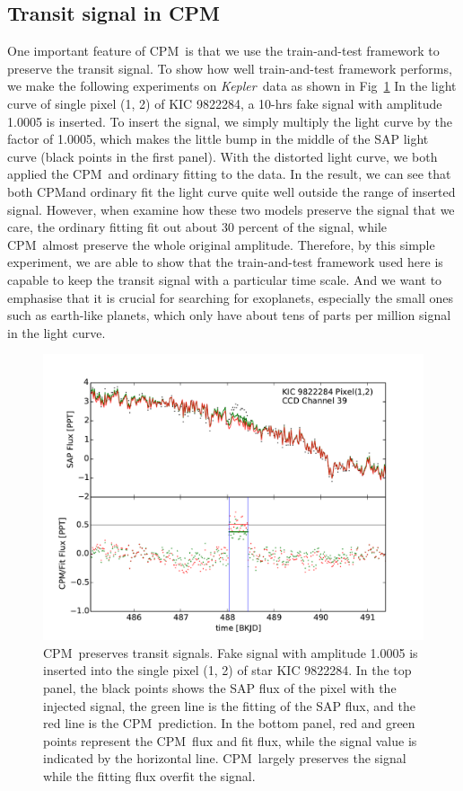 \documentclass[12pt, preprint]{aastex}
\newcommand{\project}[1]{\textsl{#1}}
\newcommand{\Kepler}{\project{Kepler}}
\newcommand{\name}{CPM}
\begin{document}
\subsection{Transit signal in \name}
One important feature of \name\ is that we use the train-and-test framework to preserve 
the transit signal. To show how well train-and-test framework performs, we make the
following experiments on \Kepler\ data as shown in Fig~\ref{distortion}
In the light curve of single pixel (1, 2) of KIC 9822284, a 10-hrs fake signal 
with amplitude 1.0005 is inserted. To insert the signal, we simply multiply the light curve 
by the factor of 1.0005, which makes the little bump in the middle of the SAP light curve 
(black points in the first panel). With the distorted light curve, we both applied the 
\name\ and ordinary fitting to the data. In the result, we can see that both \name and 
ordinary fit the light curve quite well outside the range of inserted signal. However, 
when examine how these two models preserve the signal that we care, the ordinary
fitting fit out about 30 percent of the signal, while \name\ almost preserve the whole 
original amplitude. Therefore,  by this simple experiment, we are able to show that 
the train-and-test framework used here is capable to keep the transit signal with 
a particular time scale. And we want to emphasise that it is crucial for searching for
exoplanets, especially the small ones such as earth-like planets, which only have  
about tens of parts per million signal in the light curve.

\begin{figure}[htb]
\centering
\includegraphics[width=\columnwidth]{distortion_9822284_normal}
\caption{
  \label{distortion} 
  \name\ preserves transit signals. 
  Fake signal with amplitude 1.0005 is inserted into the single pixel (1, 2) of star KIC 9822284. 
  In the top panel, the black points shows the SAP flux of the pixel with the injected signal, 
    the green line is the fitting of the SAP flux, and the red line is the \name\ prediction. 
  In the bottom panel, red and green points represent the \name\ flux and fit flux, 
    while the signal value is indicated by the horizontal line. 
  \name\ largely preserves the signal while the fitting flux overfit the signal.}
\end{figure}
\end{document}
